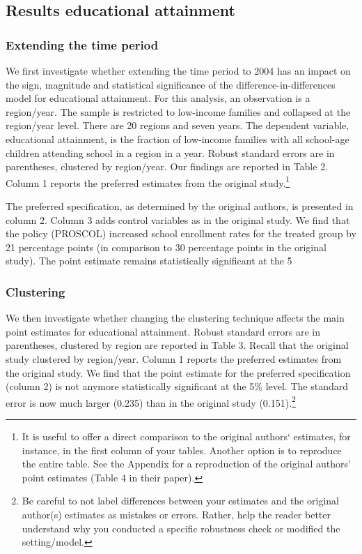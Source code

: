 \documentclass[12pt,a4paper]{article}
\begin{document}
\subsection{Results educational attainment}

\subsubsection{Extending the time period}

We first investigate whether extending the time period to 2004 has an impact on the sign, magnitude and statistical significance of the difference-in-differences model for educational attainment. For this analysis, an observation is a region/year. The sample is restricted to low-income families and collapsed at the region/year level. There are 20 regions and seven years. The dependent variable, educational attainment, is the fraction of low-income families with all school-age children attending school in a region in a year. Robust standard errors are in parentheses, clustered by region/year. Our findings are reported in Table 2. Column 1 reports the preferred estimates from the original study.\footnote{It is useful to offer a direct comparison to the original authors‘ estimates, for instance, in the first column of your tables. Another option is to reproduce the entire table. See the Appendix for a reproduction of the original authors’ point estimates (Table 4 in their paper).}

The preferred specification, as determined by the original authors, is presented in column 2. Column 3 adds control variables as in the original study. We find that the policy (PROSCOL) increased school enrollment rates for the treated group by 21 percentage points (in comparison to 30 percentage points in the original study). The point estimate remains statistically significant at the 5%

\subsubsection{Clustering}

We then investigate whether changing the clustering technique affects the main point estimates for educational attainment. Robust standard errors are in parentheses, clustered by region are reported in Table 3. Recall that the original study clustered by region/year. Column 1 reports the preferred estimates from the original study. We find that the point estimate for the preferred specification (column 2) is not anymore statistically significant at the 5\% level. The standard error is now much larger (0.235) than in the original study (0.151).\footnote{Be careful to not label differences between your estimates and the original author(s) estimates as mistakes or errors. Rather, help the reader better understand why you conducted a specific robustness check or modified the setting/model.}
\end{document}
